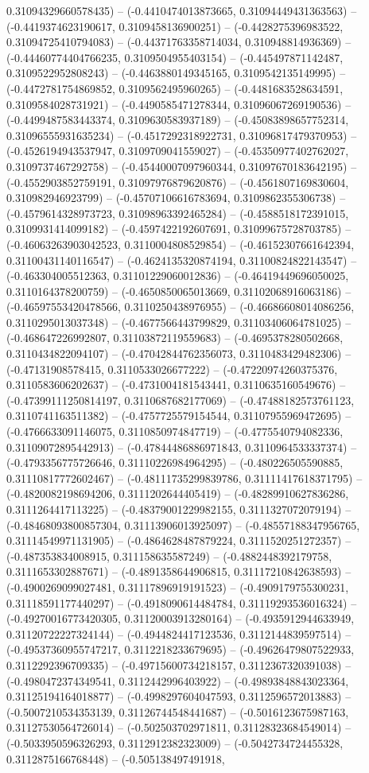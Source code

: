 0.31094329660578435) -- (-0.4410474013873665, 0.31094449431363563) -- (-0.4419374623190617, 0.3109458136900251) -- (-0.4428275396983522, 0.31094725410794083) -- (-0.44371763358714034, 0.310948814936369) -- (-0.44460774404766235, 0.3109504955403154) -- (-0.445497871142487, 0.3109522952808243) -- (-0.4463880149345165, 0.3109542135149995) -- (-0.4472781754869852, 0.3109562495960265) -- (-0.4481683528634591, 0.3109584028731921) -- (-0.4490585471278344, 0.31096067269190536) -- (-0.4499487583443374, 0.3109630583937189) -- (-0.45083898657752314, 0.31096555931635234) -- (-0.4517292318922731, 0.31096817479370953) -- (-0.4526194943537947, 0.3109709041559027) -- (-0.45350977402762027, 0.3109737467292758) -- (-0.45440007097960344, 0.31097670183642195) -- (-0.4552903852759191, 0.31097976879620876) -- (-0.4561807169830604, 0.310982946923799) -- (-0.45707106616783694, 0.3109862355306738) -- (-0.4579614328973723, 0.31098963392465284) -- (-0.4588518172391015, 0.3109931414099182) -- (-0.4597422192607691, 0.31099675728703785) -- (-0.46063263903042523, 0.3110004808529854) -- (-0.46152307661642394, 0.31100431140116547) -- (-0.4624135320874194, 0.31100824822143547) -- (-0.463304005512363, 0.31101229060012836) -- (-0.46419449696050025, 0.3110164378200759) -- (-0.4650850065013669, 0.31102068916063186) -- (-0.46597553420478566, 0.3110250438976955) -- (-0.46686608014086256, 0.3110295013037348) -- (-0.4677566443799829, 0.31103406064781025) -- (-0.468647226992807, 0.31103872119559683) -- (-0.4695378280502668, 0.3110434822094107) -- (-0.47042844762356073, 0.3110483429482306) -- (-0.47131908578415, 0.3110533026677222) -- (-0.47220974260375376, 0.3110583606202637) -- (-0.4731004181543441, 0.3110635160549676) -- (-0.47399111250814197, 0.3110687682177069) -- (-0.47488182573761123, 0.3110741163511382) -- (-0.4757725579154544, 0.31107955969472695) -- (-0.4766633091146075, 0.3110850974847719) -- (-0.4775540794082336, 0.31109072895442913) -- (-0.47844486886971843, 0.3110964533337374) -- (-0.4793356775726646, 0.31110226984964295) -- (-0.480226505590885, 0.31110817772602467) -- (-0.48111735299839786, 0.31111417618371795) -- (-0.4820082198694206, 0.3111202644405419) -- (-0.48289910627836286, 0.3111264417113225) -- (-0.48379001229982155, 0.3111327072079194) -- (-0.48468093800857304, 0.31113906013925097) -- (-0.48557188347956765, 0.31114549971131905) -- (-0.4864628487879224, 0.3111520251272357) -- (-0.487353834008915, 0.311158635587249) -- (-0.4882448392179758, 0.3111653302887671) -- (-0.4891358644906815, 0.31117210842638593) -- (-0.4900269099027481, 0.31117896919191523) -- (-0.4909179755300231, 0.31118591177440297) -- (-0.4918090614484784, 0.31119293536016324) -- (-0.49270016773420305, 0.31120003913280164) -- (-0.4935912944633949, 0.31120722227324144) -- (-0.4944824417123536, 0.3112144839597514) -- (-0.49537360955747217, 0.3112218233679695) -- (-0.49626479807522933, 0.3112292396709335) -- (-0.49715600734218157, 0.3112367320391038) -- (-0.4980472374349541, 0.3112442996403922) -- (-0.49893848843023364, 0.31125194164018877) -- (-0.4998297604047593, 0.3112596572013883) -- (-0.5007210534353139, 0.31126744548441687) -- (-0.5016123675987163, 0.31127530564726014) -- (-0.502503702971811, 0.31128323684549014) -- (-0.5033950596326293, 0.3112912382323009) -- (-0.5042734724455328, 0.3112875166768448) -- (-0.505138497491918, 